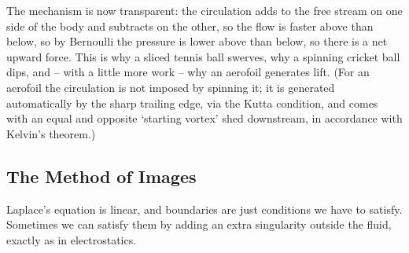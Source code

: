 \begin{center}
\end{center}

The mechanism is now transparent: the circulation adds to the free stream on one side of the body and subtracts on the other, so the flow is faster above than below, so by Bernoulli the pressure is lower above than below, so there is a net upward force. This is why a sliced tennis ball swerves, why a spinning cricket ball dips, and -- with a little more work -- why an aerofoil generates lift. (For an aerofoil the circulation is not imposed by spinning it; it is generated automatically by the sharp trailing edge, via the Kutta condition, and comes with an equal and opposite `starting vortex' shed downstream, in accordance with Kelvin's theorem.)

\subsection{The Method of Images}

Laplace's equation is linear, and boundaries are just conditions we have to satisfy. Sometimes we can satisfy them by adding an extra singularity outside the fluid, exactly as in electrostatics.

